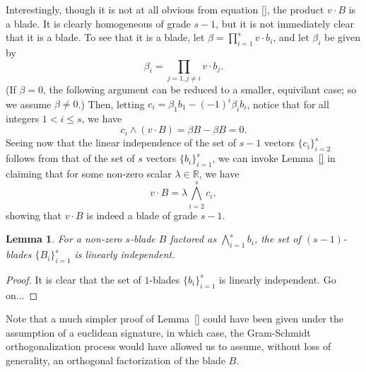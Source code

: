 \documentclass{birkjour}
\newtheorem{lem}[thm]{Lemma}
\theoremstyle{definition}
\theoremstyle{remark}
\numberwithin{equation}{section}
\newcommand{\R}{\mathbb{R}}
\begin{document}
Interestingly, though it is not at all obvious from equation \eqref{}, the product
$v\cdot B$ is a blade.  It is clearly homogeneous of grade $s-1$, but it is not
immediately clear that it is a blade.  To see that it is a blade, let $\beta=\prod_{i=1}^s v\cdot b_i$,
and let $\beta_i$ be given by
\begin{equation*}
\beta_i=\prod_{j=1,j\neq i}v\cdot b_j.
\end{equation*}
(If $\beta=0$, the following argument can be reduced to a smaller, equivilant case; so
we assume $\beta\neq 0$.)
Then, letting $c_i=\beta_1b_1-(-1)^i\beta_ib_i$, notice that for all integers $1<i\leq s$,
we have
\begin{equation*}
c_i\wedge (v\cdot B)=\beta B-\beta B=0.
\end{equation*}
Seeing now that the linear independence of the set of $s-1$ vectors
$\{c_i\}_{i=2}^s$ follows from that of the set of $s$ vectors $\{b_i\}_{i=1}^s$,
we can invoke Lemma~\ref{} in claiming that for some non-zero scalar $\lambda\in\R$,
we have
\begin{equation*}
v\cdot B = \lambda\bigwedge_{i=2}^s c_i,
\end{equation*}
showing that $v\cdot B$ is indeed a blade of grade $s-1$.

\begin{lem}
For a non-zero $s$-blade $B$ factored as $\bigwedge_{i=1}^s b_i$, the set of
$(s-1)$-blades $\{B_i\}_{i=1}^s$ is linearly independent.
\end{lem}
\begin{proof}
It is clear that the set of $1$-blades $\{b_i\}_{i=1}^s$ is linearly independent.  Go on...
\end{proof}

Note that a much simpler proof of Lemma~\ref{} could have been given under the assumption of a euclidean signature,
in which case, the Gram-Schmidt orthogonalization process would have allowed us to assume, without loss
of generality, an orthogonal factorization of the blade $B$.


\begin{thebibliography}{9}

\end{thebibliography}
\end{document}
